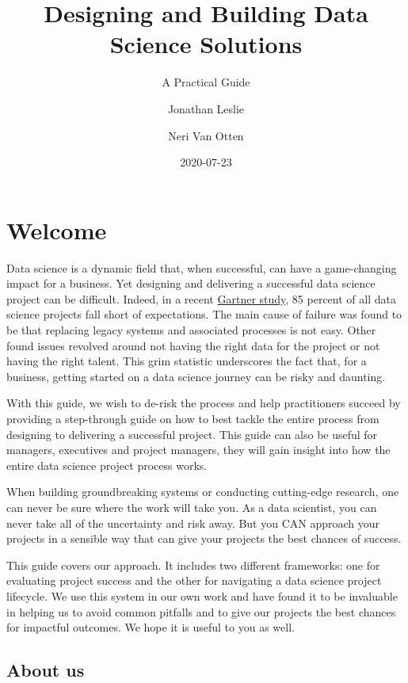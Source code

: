 \documentclass[
]{book}
\title{Designing and Building Data Science Solutions}
\subtitle{A Practical Guide}
\author{Jonathan Leslie \and Neri Van Otten}
\date{2020-07-23}
\begin{document}
\maketitle

{
\setcounter{tocdepth}{1}
\tableofcontents
}
\hypertarget{welcome}{%
\chapter*{Welcome}\label{welcome}}

Data science is a dynamic field that, when successful, can have a game-changing impact for a business. Yet designing and delivering a successful data science project can be difficult. Indeed, in a recent \href{https://www.gartner.com/en/newsroom/press-releases/2018-02-13-gartner-says-nearly-half-of-cios-are-planning-to-deploy-artificial-intelligence}{Gartner study}, 85 percent of all data science projects fall short of expectations. The main cause of failure was found to be that replacing legacy systems and associated processes is not easy. Other found issues revolved around not having the right data for the project or not having the right talent. This grim statistic underscores the fact that, for a business, getting started on a data science journey can be risky and daunting.

With this guide, we wish to de-risk the process and help practitioners succeed by providing a step-through guide on how to best tackle the entire process from designing to delivering a successful project. This guide can also be useful for managers, executives and project managers, they will gain insight into how the entire data science project process works.

When building groundbreaking systems or conducting cutting-edge research, one can never be sure where the work will take you. As a data scientist, you can never take all of the uncertainty and risk away. But you CAN approach your projects in a sensible way that can give your projects the best chances of success.

This guide covers our approach. It includes two different frameworks: one for evaluating project success and the other for navigating a data science project lifecycle. We use this system in our own work and have found it to be invaluable in helping us to avoid common pitfalls and to give our projects the best chances for impactful outcomes. We hope it is useful to you as well.

\hypertarget{about-us}{%
\section*{About us}\label{about-us}}
\end{document}
